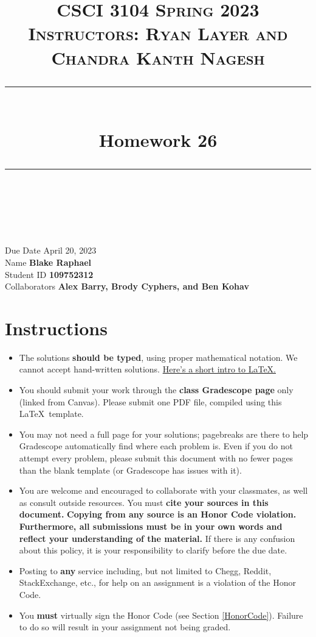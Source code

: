 \documentclass[11pt]{article}
\title{
\normalfont \normalsize
\textsc{CSCI 3104 Spring 2023 \\
Instructors: Ryan Layer and Chandra Kanth Nagesh} \\
[10pt]
\rule{\linewidth}{0.5pt} \\[6pt]
\huge Homework 26 \\
\rule{\linewidth}{2pt}  \\[10pt]
}
\author{}
\date{}
\theoremstyle{definition}
\theoremstyle{definition}
\theoremstyle{definition}
\begin{document}

\maketitle


\noindent
Due Date \dotfill April 20, 2023 \\
Name \dotfill \textbf{Blake Raphael} \\
Student ID \dotfill \textbf{109752312} \\
Collaborators \dotfill \textbf{Alex Barry, Brody Cyphers, and Ben Kohav}

\tableofcontents

\section{Instructions}
 \begin{itemize}
	\item The solutions \textbf{should be typed}, using proper mathematical notation. We cannot accept hand-written solutions. \href{http://ece.uprm.edu/~caceros/latex/introduction.pdf}{Here's a short intro to \LaTeX.}
	\item You should submit your work through the \textbf{class Gradescope page} only (linked from Canvas). Please submit one PDF file, compiled using this \LaTeX \ template.
	\item You may not need a full page for your solutions; pagebreaks are there to help Gradescope automatically find where each problem is. Even if you do not attempt every problem, please submit this document with no fewer pages than the blank template (or Gradescope has issues with it).

	\item You are welcome and encouraged to collaborate with your classmates, as well as consult outside resources. You must \textbf{cite your sources in this document.} \textbf{Copying from any source is an Honor Code violation. Furthermore, all submissions must be in your own words and reflect your understanding of the material.} If there is any confusion about this policy, it is your responsibility to clarify before the due date. 

	\item Posting to \textbf{any} service including, but not limited to Chegg, Reddit, StackExchange, etc., for help on an assignment is a violation of the Honor Code.

	\item You \textbf{must} virtually sign the Honor Code (see Section \ref{HonorCode}). Failure to do so will result in your assignment not being graded.
\end{itemize}
\end{document}
